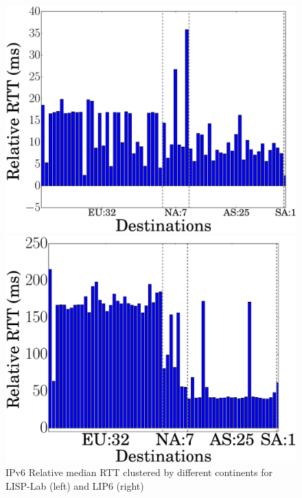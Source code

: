 \begin{figure}[!t]
	\begin{minipage}[c]{.49\linewidth}
		\begin{center}
			\includegraphics[width=\textwidth]{Pics/v6/Relative_median_avg(RTT)_LISP-Lab-FranceIX.eps}
		\end{center}
	\end{minipage}
	\begin{minipage}[c]{.49\linewidth}
		\begin{center}
			\includegraphics[width=\textwidth]{Pics/v6/Relative_median_avg(RTT)_LIP6-FranceIX_changed_60.eps}
		\end{center}
	\end{minipage}
	\vspace{-0.5mm}
	\caption{IPv6 Relative median RTT clustered by different continents for LISP-Lab (left) and LIP6 (right)}
	\label{Relative_median_avg(RTT)_v6_2016}
\end{figure}
